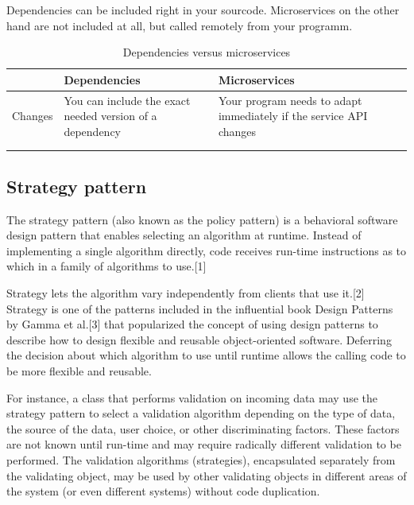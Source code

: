 Dependencies can be included right in your sourcode. Microservices on the other hand are not included at all, but called remotely from your programm. 


\begin{table}[h]
\centering
\caption{Dependencies versus microservices}
\begin{tabular}{@{}lllll@{}}
\toprule
        & Dependencies                                             & Microservices                                                      &  &  \\ \midrule
Changes & You can include the exact needed version of a dependency & Your program needs to adapt immediately if the service API changes &  &  \\
        &                                                          &                                                                    &  &  \\
        &                                                          &                                                                    &  &  \\ \bottomrule
\end{tabular}
\end{table}


\subsection{Strategy pattern}

The strategy pattern (also known as the policy pattern) is a behavioral software design pattern that enables selecting an algorithm at runtime. Instead of implementing a single algorithm directly, code receives run-time instructions as to which in a family of algorithms to use.[1]

Strategy lets the algorithm vary independently from clients that use it.[2] Strategy is one of the patterns included in the influential book Design Patterns by Gamma et al.[3] that popularized the concept of using design patterns to describe how to design flexible and reusable object-oriented software. Deferring the decision about which algorithm to use until runtime allows the calling code to be more flexible and reusable.

For instance, a class that performs validation on incoming data may use the strategy pattern to select a validation algorithm depending on the type of data, the source of the data, user choice, or other discriminating factors. These factors are not known until run-time and may require radically different validation to be performed. The validation algorithms (strategies), encapsulated separately from the validating object, may be used by other validating objects in different areas of the system (or even different systems) without code duplication.

